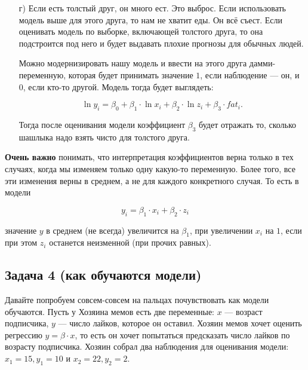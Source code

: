 \documentclass[12pt, a4paper, oneside]{article}
\begin{document}
{\begin{enumerate}
		Такие модели, записанные в логарифмах интерпретируются чуть сложнее линейных. Коэффициент $\beta_1$ отражает то, на сколько процентов будет расти количество необходимого шашлыка, при росте числа людей на $1\%$. Коэффициент $\beta_2$ будет говорить, на сколько процентов будет расти количество необходимого шашлыка, при увеличении числа дней.
		
		\item[г)]   Если есть толстый друг, он много ест. Это выброс. Если использовать модель выше для этого друга, то нам не хватит еды. Он всё съест. Если оценивать модель по выборке, включающей толстого друга, то она подстроится под него и будет выдавать плохие прогнозы для обычных людей. 
		
		Можно модернизировать нашу модель и ввести на этого друга дамми-переменную, которая будет принимать значение $1$, если наблюдение --- он, и $0$, если кто-то другой. Модель тогда будет выглядеть: 
		
		\[ \ln y_i = \beta_0 + \beta_1 \cdot \ln x_i + \beta_2 \cdot \ln z_i + \beta_3 \cdot fat_i.\]
		
		Тогда после оценивания модели коэффициент $\beta_3$ будет отражать то, сколько шашлыка надо взять чисто для толстого друга. 
		

	\end{enumerate}	
	
	\textbf{Очень важно} понимать, что интерпретация коэффициентов верна только в тех случаях, когда мы изменяем только одну какую-то переменную. Более того, все эти изменения верны в среднем, а не для каждого конкретного случая. То есть в модели 
	
	\[ y_i = \beta_1 \cdot  x_i + \beta_2 \cdot  z_i \]
	
	значение $y$ в среднем (не всегда) увеличится на $\beta_1$, при увеличении $x_i$ на $1$, если при этом $z_i$ останется неизменной (при прочих равных).
}


\subsection*{Задача 4  (как обучаются модели)}

Давайте попробуем совсем-совсем на пальцах почувствовать как модели обучаются. Пусть у Хозяина мемов есть две переменные: $x$ --- возраст подписчика, $y$ --- число лайков, которое он оставил. Хозяин мемов хочет оценить регрессию $y = \beta \cdot x$, то есть он хочет попытаться предсказать число лайков по возрасту подписчика. Хозяин собрал два наблюдения для оценивания модели: $x_1 = 15, y_1 = 10$ и $x_2 = 22, y_2 = 2$.
\end{document}
